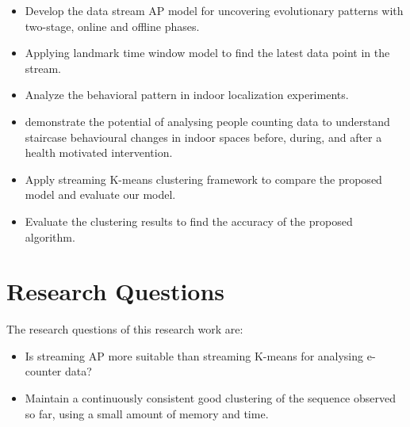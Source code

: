 \begin{itemize}
    \item Develop the data stream AP model for uncovering evolutionary patterns with two-stage, online and offline phases.
     \item Applying landmark time window model to find the latest data point in the stream.
   
    \item Analyze the behavioral pattern in indoor localization experiments.
    \item demonstrate the potential of analysing people counting data to understand staircase behavioural changes in indoor spaces before, during, and after a health motivated intervention.
    \item Apply streaming K-means clustering framework to compare the proposed model and evaluate our model.
    \item Evaluate the clustering results to find the accuracy of the proposed algorithm.




\end{itemize}
 

\section{Research Questions}


The research questions of this research work are: 
\begin{itemize}
    \item Is streaming AP more suitable than streaming K-means for analysing e-counter data? 
    \item Maintain a continuously consistent good clustering of the sequence observed so far, using a small amount of memory and time.

\end{itemize}


